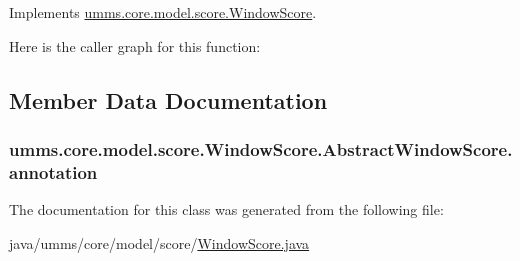 Implements \hyperlink{interfaceumms_1_1core_1_1model_1_1score_1_1_window_score_ade117fa7e14c8e6839af41f8a9f1cbb2}{umms.\+core.\+model.\+score.\+Window\+Score}.



Here is the caller graph for this function\+:




\subsection{Member Data Documentation}
\hypertarget{classumms_1_1core_1_1model_1_1score_1_1_window_score_1_1_abstract_window_score_a455fb02f18f492e611113b9da0a24888}{
\subsubsection[{annotation}]{ umms.\+core.\+model.\+score.\+Window\+Score.\+Abstract\+Window\+Score.\+annotation\hspace{0.3cm}{\ttfamily [protected]}}}\label{classumms_1_1core_1_1model_1_1score_1_1_window_score_1_1_abstract_window_score_a455fb02f18f492e611113b9da0a24888}


The documentation for this class was generated from the following file\+:\begin{DoxyCompactItemize}
\item 
java/umms/core/model/score/\hyperlink{_window_score_8java}{Window\+Score.\+java}\end{DoxyCompactItemize}
